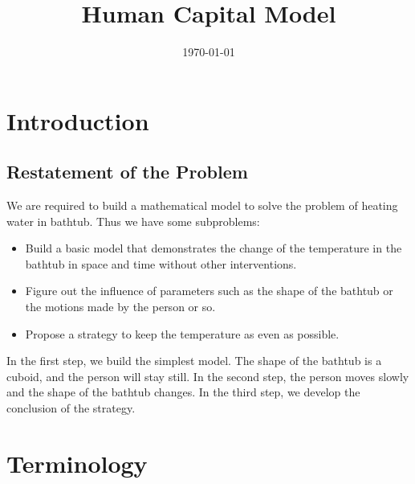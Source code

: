 \documentclass[12pt,a4paper,titlepage]{article}
\begin{document}
\title{Human Capital Model} \date{\today{}}
\maketitle

\tableofcontents

\newpage

\section{Introduction}
\label{sec:introduction}

\subsection{Restatement of the Problem}
\label{sec:restatement-of-the-problem}
We are required to build a mathematical model to solve the problem of heating water in bathtub. Thus we have some subproblems:
\begin{itemize}
\item Build a basic model that demonstrates the change of the temperature in the bathtub in space and time without other interventions.
\item Figure out the influence of parameters such as the shape of the bathtub or the motions made by the person or so.
\item Propose a strategy to keep the temperature as even as possible.
\end{itemize}
In the first step, we build the simplest model. The shape of the bathtub is a cuboid, and the person will stay still. In the second step, the person moves slowly and the shape of the bathtub changes. In the third step, we develop the conclusion of the strategy.

\section{Terminology}
\label{sec:terminology}
\end{document}
